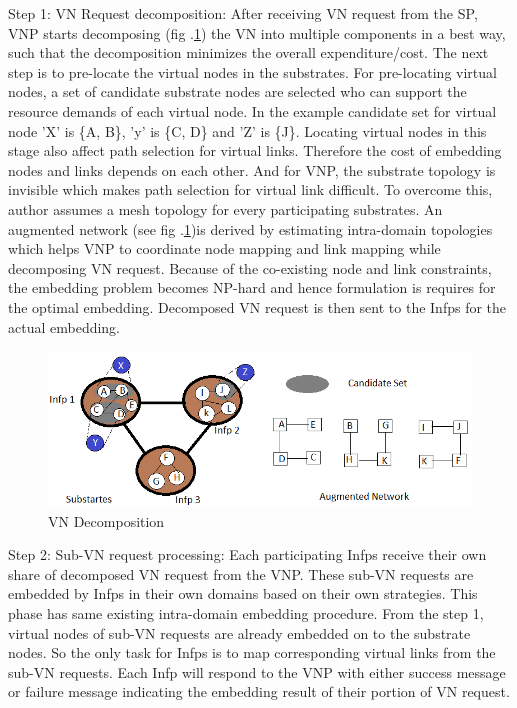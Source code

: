 \documentclass[article,dr=phil,type=msc ,colorback,accentcolor=tud4b]{tudthesis}
\begin{document}
\begin{enumerate}[label=(\Alph*)]
Step 1:  VN Request decomposition: After receiving VN request from the SP, VNP starts decomposing (fig .\ref{IDE_decomp}) the VN into multiple components in a best way, such that the decomposition minimizes the overall expenditure/cost. The next step is to pre-locate the virtual nodes in the substrates. For pre-locating virtual nodes, a set of candidate substrate nodes are selected who can support the resource demands of each virtual node. In the example candidate set for virtual node 'X' is \{A, B\}, 'y' is \{C, D\} and 'Z' is \{J\}.  Locating virtual nodes in this stage also affect path selection for virtual links. Therefore the cost of embedding nodes and links depends on each other. And for VNP, the substrate topology is invisible which makes path selection for virtual link difficult. To overcome this, author assumes a mesh topology for every participating substrates. An augmented network (see fig .\ref{IDE_decomp})is derived by estimating intra-domain topologies which helps VNP to coordinate node mapping and link mapping while decomposing VN request. Because of the co-existing node and link constraints, the embedding problem becomes NP-hard and hence formulation is requires for the optimal embedding. Decomposed VN request is then sent to the Infps for the actual embedding.
\begin{figure}[h]
	\centering
	\includegraphics[width=\linewidth]{IDE_decomp.png}
	\caption{VN Decomposition}
	\label{IDE_decomp}
\end{figure}

Step 2: Sub-VN request processing: Each participating Infps receive their own share of decomposed VN request from the VNP. These sub-VN requests are embedded by Infps in their own domains based on their own strategies. This phase has same existing intra-domain embedding procedure. From the step 1, virtual nodes of sub-VN requests are already embedded on to the substrate nodes. So the only task for Infps is to map corresponding virtual links from the sub-VN requests. Each Infp will respond to the VNP with either success message or failure message indicating the embedding result of their portion of VN request. 


\end{enumerate}
\end{document}
